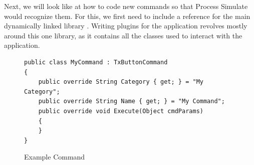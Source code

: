 Next, we will look like at how to code new commands so that Process Simulate would recognize them. For this, we first need to include a reference for the main dynamically linked library . Writing plugins for the application revolves mostly around this one library, as it contains all the classes used to interact with the application.

\begin{figure}[H]
    \caption{Example Command}
    \centering
    \begin{verbatim}
public class MyCommand : TxButtonCommand
{
    public override String Category { get; } = "My Category";
    public override String Name { get; } = "My Command";
    public override void Execute(Object cmdParams)
    {
    }
}
    \end{verbatim}
    \label{fig:CodeCommand}
\end{figure}
